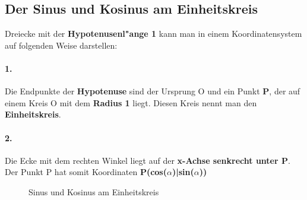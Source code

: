 \documentclass{standalone}
\begin{document}
\subsection{Der Sinus und Kosinus am Einheitskreis}
\noindent
Dreiecke mit der \textbf{Hypotenusenl{"a}nge 1} kann man in einem Koordinatensystem auf folgenden Weise darstellen:
\begin{multicols}{2}
	\paragraph{1. }
	Die Endpunkte der \textbf{Hypotenuse} sind der Ursprung O und ein Punkt \textbf{P}, der auf einem Kreis O mit dem \textbf{Radius 1} liegt. Diesen Kreis nennt man den \textbf{Einheitskreis}.
	\paragraph{2. }
	Die Ecke mit dem rechten Winkel liegt auf der \textbf{x-Achse senkrecht unter P}. Der Punkt P hat somit Koordinaten \textbf{P(cos($\alpha$)|sin($\alpha$))}
\end{multicols}
\begin{figure}[hb!]
	\centering
	\def\svgwidth{250px}
	
	\caption{Sinus und Kosinus am Einheitskreis}
	\label{fig:sin_cos_einheitskreis}
\end{figure}
\end{document}
